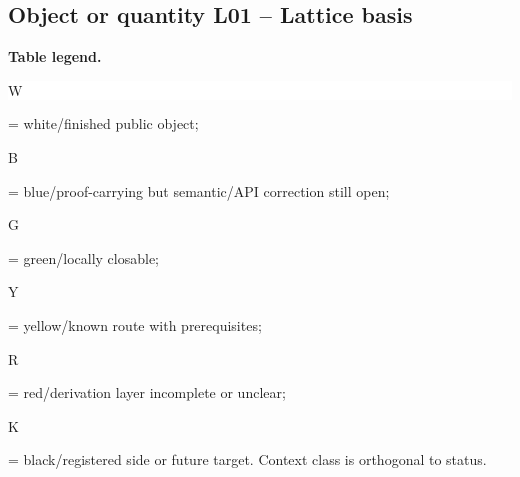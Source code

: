 \subsection*{Object or quantity L01 -- Lattice basis}
\hypertarget{objproof:L01}{}
\par\smallskip\noindent\begin{minipage}{0.99\linewidth}\footnotesize\raggedright\textbf{Table legend.} \colorbox{white}{\strut W} = white/finished public object; \colorbox{cyan!20}{\strut B} = blue/proof-carrying but semantic/API correction still open; \colorbox{green!18}{\strut G} = green/locally closable; \colorbox{yellow!25}{\strut Y} = yellow/known route with prerequisites; \colorbox{red!20}{\strut R} = red/derivation layer incomplete or unclear; \colorbox{black!18}{\strut K} = black/registered side or future target. Context class is orthogonal to status.\end{minipage}\par\vspace{0.25em}
